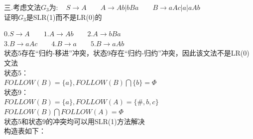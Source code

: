 \documentclass{article}
\begin{document}
\noindent
三.考虑文法$G_{3}为:\quad S \rightarrow A  \qquad A \rightarrow Ab|bBa \qquad B \rightarrow aAc|a|aAb $\\
证明$G_{3}$是SLR(1)而不是LR(0)的\\
\begin{minipage}[h]{0.6\linewidth}
    \begin{flushleft}
        $0.S \rightarrow A \qquad 1.A \rightarrow Ab \qquad 2.A  \rightarrow bBa$\\
        $3.B \rightarrow aAc \qquad 4.B \rightarrow a \qquad 5.B  \rightarrow aAb$ \\
        状态5存在“归约-移进”冲突，状态9存在“归约-归约”冲突，因此该文法不是LR(0)文法\\

        状态5：\\
        $FOLLOW(B)=\{a\},FOLLOW(B)\bigcap \{b\}=\Phi$\\

        状态9：\\
        $FOLLOW(B)=\{a\},FOLLOW(A)=\{\#,b,c\}$\\
        $FOLLOW(B)\bigcap FOLLOW(A)=\Phi$\\

        状态5和状态9的冲突均可以用SLR(1)方法解决\\构造表如下：


\end{flushleft}
\end{minipage}
\end{document}

